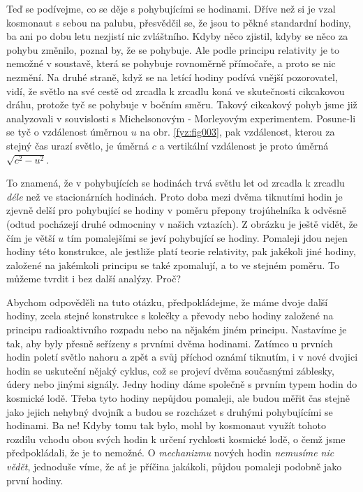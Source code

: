    Teď se podívejme, co se děje s pohybujícími se hodinami. Dříve než si je vzal kosmonaut s sebou 
    na palubu, přesvědčil se, že jsou to pěkné standardní hodiny, ba ani po dobu letu nezjistí nic 
    zvláštního. Kdyby něco zjistil, kdyby se něco za pohybu změnilo, poznal by, že se pohybuje. Ale 
    podle principu relativity je to nemožné v soustavě, která se pohybuje rovnoměrně přímočaře, a 
    proto se nic nezmění. Na druhé straně, když se na letící hodiny podívá vnější pozorovatel, 
    vidí, že světlo na své cestě od zrcadla k zrcadlu koná ve skutečnosti cikcakovou dráhu, protože 
    tyč se pohybuje v bočním směru. Takový cikcakový pohyb jsme již analyzovali v souvislosti s 
    Michelsonovým - Morleyovým experimentem. Posune-li se tyč o vzdálenost úměrnou \(u\) na obr. 
    \ref{fyz:fig003}, pak vzdálenost, kterou za stejný čas urazí světlo, je úměrná \(c\) a 
    vertikální vzdálenost je proto úměrná \(\sqrt{c^2 - u^2}\).
    
    To znamená, že v pohybujících se hodinách trvá světlu let od zrcadla k zrcadlu \emph{déle} než 
    ve stacionárních hodinách. Proto doba mezi dvěma tiknutími hodin je zjevně delší pro pohybující 
    se hodiny v poměru přepony trojúhelníka k odvěsně (odtud pocházejí druhé odmocniny v našich 
    vztazích). Z obrázku je ještě vidět, že čím je větší \(u\) tím pomalejšími se jeví pohybující 
    se hodiny. Pomaleji jdou nejen hodiny této konstrukce, ale jestliže platí teorie relativity, 
    pak jakékoli jiné hodiny, založené na jakémkoli principu se také zpomalují, a to ve stejném 
    poměru. To můžeme tvrdit i bez další analýzy. Proč?
    
    Abychom odpověděli na tuto otázku, předpokládejme, že máme dvoje další hodiny, zcela stejné 
    konstrukce s kolečky a převody nebo hodiny založené na principu radioaktivního rozpadu nebo na 
    nějakém jiném principu. Nastavíme je tak, aby byly přesně seřízeny s prvními dvěma hodinami. 
    Zatímco u prvních hodin poletí světlo nahoru a zpět a svůj příchod oznámí tiknutím, i v nové 
    dvojici hodin se uskuteční nějaký cyklus, což se projeví dvěma současnými záblesky, údery nebo 
    jinými signály. Jedny hodiny dáme společně s prvním typem hodin do kosmické lodě. Třeba tyto 
    hodiny nepůjdou pomaleji, ale budou měřit čas stejně jako jejich nehybný dvojník a budou se 
    rozcházet s druhými pohybujícími se hodinami. Ba ne! Kdyby tomu tak bylo, mohl by kosmonaut 
    využít tohoto rozdílu vchodu obou svých hodin k určení rychlosti kosmické lodě, o čemž jsme 
    předpokládali, že je to nemožné. O \emph{mechanizmu} nových hodin \emph{nemusíme nic vědět}, 
    jednoduše víme, že ať je příčina jakákoli, půjdou pomaleji podobně jako první hodiny.
    
